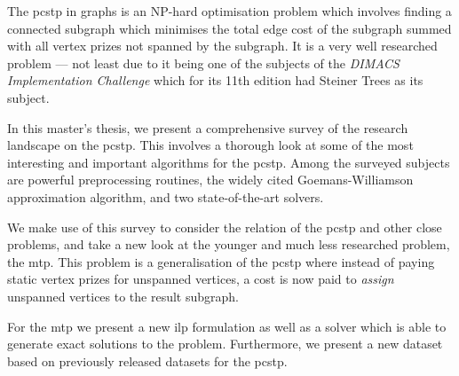 The \gls{pcstp} in graphs is an NP-hard optimisation problem which involves
finding a connected subgraph which minimises the total edge cost of
the subgraph summed with all vertex prizes not spanned by the subgraph.
It is a very well researched problem --- not least due to it being one of the
subjects of the \textit{DIMACS Implementation Challenge} which
for its 11th edition had Steiner Trees as its subject.

In this master's thesis, we present a comprehensive survey of the research landscape
on the \gls{pcstp}. This involves a thorough look at some of the most interesting
and important algorithms for the \gls{pcstp}. Among the surveyed subjects are
powerful preprocessing routines, the widely cited Goemans-Williamson approximation
algorithm, and two state-of-the-art solvers.

We make use of this survey to consider the relation of the \gls{pcstp} and other close
 problems, and take a new look at the younger and much less researched problem, the
\gls{mtp}. This problem is a generalisation of the \gls{pcstp} where instead of paying
static vertex prizes for unspanned vertices, a cost is now paid to \textit{assign}
unspanned vertices to the result subgraph.

For the \gls{mtp} we present a new \acrlong{ilp} formulation as well as a solver which
is able to generate exact solutions to the problem. Furthermore, we present a new
dataset based on previously released datasets for the \gls{pcstp}.

